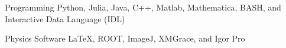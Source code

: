 

\begin{cvskills}

  \cvskill
    {Programming} %
    { Python, Julia, Java, C++, Matlab, Mathematica, BASH, and Interactive Data Language (IDL)} %

  \cvskill
    {Physics Software} %
    {LaTeX, ROOT, ImageJ, XMGrace, and Igor Pro} %




\end{cvskills}
